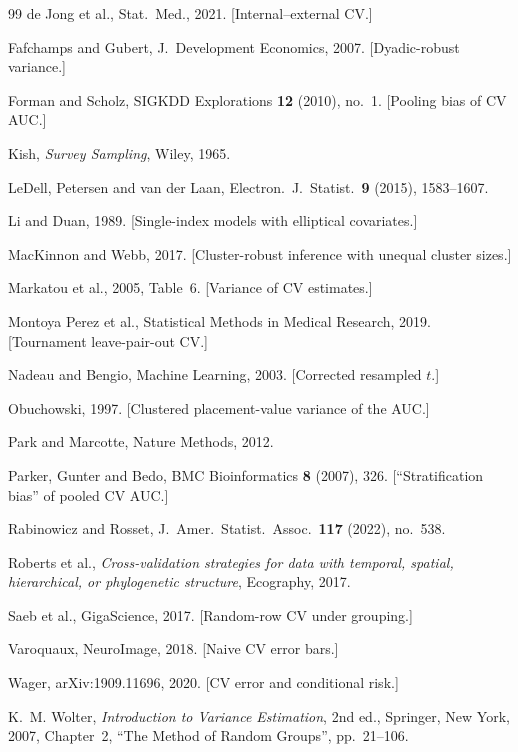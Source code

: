 \documentclass[11pt]{amsart}
\theoremstyle{plain}
\theoremstyle{definition}
\theoremstyle{remark}
\begin{document}
\begin{thebibliography}{99}
 de Jong et al., Stat.\ Med., 2021. [Internal--external CV.]

 Fafchamps and Gubert, J.\ Development Economics, 2007. [Dyadic-robust variance.]

 Forman and Scholz, SIGKDD Explorations \textbf{12} (2010), no.~1. [Pooling bias of CV AUC.]

 Kish, \emph{Survey Sampling}, Wiley, 1965.

 LeDell, Petersen and van der Laan, Electron.\ J.\ Statist.\ \textbf{9} (2015), 1583--1607.

 Li and Duan, 1989. [Single-index models with elliptical covariates.]

 MacKinnon and Webb, 2017. [Cluster-robust inference with unequal cluster sizes.]

 Markatou et al., 2005, Table~6. [Variance of CV estimates.]

 Montoya Perez et al., Statistical Methods in Medical Research, 2019. [Tournament leave-pair-out CV.]

 Nadeau and Bengio, Machine Learning, 2003. [Corrected resampled $t$.]

 Obuchowski, 1997. [Clustered placement-value variance of the AUC.]

 Park and Marcotte, Nature Methods, 2012.

 Parker, Gunter and Bedo, BMC Bioinformatics \textbf{8} (2007), 326. [``Stratification bias'' of pooled CV AUC.]

 Rabinowicz and Rosset, J.\ Amer.\ Statist.\ Assoc.\ \textbf{117} (2022), no.~538.

 Roberts et al., \emph{Cross-validation strategies for data with temporal, spatial, hierarchical, or phylogenetic structure}, Ecography, 2017.

 Saeb et al., GigaScience, 2017. [Random-row CV under grouping.]

 Varoquaux, NeuroImage, 2018. [Naive CV error bars.]

 Wager, arXiv:1909.11696, 2020. [CV error and conditional risk.]

 K.~M. Wolter, \emph{Introduction to Variance Estimation}, 2nd ed., Springer, New York, 2007, Chapter~2, ``The Method of Random Groups'', pp.~21--106.
\end{thebibliography}
\end{document}
